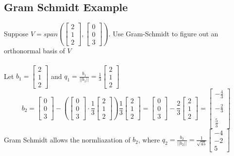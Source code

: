 \begin{enumerate}
\subsection{Gram Schmidt Example}
Suppose $V = span(\begin{bmatrix} 2 \\ 1 \\ 2 \end{bmatrix}, 
\begin{bmatrix} 0 \\ 0 \\ 3 \end{bmatrix})$. Use Gram-Schmidt to figure out an orthonormal basis of $V$ \\\\
Let $b_1 = \begin{bmatrix} 2 \\ 1 \\ 2 \end{bmatrix}$ and 
$q_1 = \frac{b_1}{||b_1||} = \frac{1}{3} \begin{bmatrix} 2 \\ 1 \\ 2 
\end{bmatrix}$
\[
  b_2 = \begin{bmatrix} 0 \\ 0 \\ 3 \end{bmatrix} - (\begin{bmatrix}
0 \\ 0 \\ 3 \end{bmatrix} \cdot \frac{1}{3} 
\begin{bmatrix} 2 \\ 1 \\ 2 \end{bmatrix}) \frac{1}{3} \begin{bmatrix}
2 \\ 1 \\ 2 \end{bmatrix} = \begin{bmatrix} 0 \\ 0 \\ 3 \end{bmatrix} 
- \frac{2}{3} \begin{bmatrix} 2 \\ 1 \\ 2 \end{bmatrix} = 
\begin{bmatrix} -\frac{4}{3} \\\\ -\frac{2}{3} \\\\ \frac{5}{3} \end{bmatrix}
\]
Gram Schmidt allows the normliazation of $b_2$, where $q_2 = \frac{
  b_2}{||b_2||} = \frac{1}{\sqrt{45}} \begin{bmatrix} -4 \\ -2 \\ 5
  \end{bmatrix}$

\end{enumerate}
